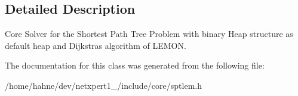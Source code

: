 \subsection{Detailed Description}
Core Solver for the Shortest Path Tree Problem with binary Heap structure as default heap and Dijkstra\textquotesingle{}s algorithm of L\+E\+M\+ON. 

The documentation for this class was generated from the following file\+:\begin{DoxyCompactItemize}
\item 
/home/hahne/dev/netxpert1\+\_/include/core/sptlem.\+h\end{DoxyCompactItemize}
